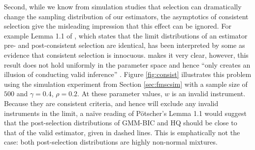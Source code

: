 \documentclass[12pt]{article}
\theoremstyle{definition}
\begin{document}
Second, while we know from simulation studies that selection can dramatically change the sampling distribution of our estimators, the asymptotics of consistent selection give the misleading impression that this effect can be ignored.
For example Lemma 1.1 of \citet[p.\ 168]{Poetscher1991}, which states that the limit distributions of an estimator pre- and post-consistent selection are identical, has been interpreted by some as evidence that consistent selection is innocuous. 
\citet[pp.\ 179--180]{Poetscher1991} makes it very clear, however, this result does not hold uniformly in the parameter space and hence ``only creates an illusion of conducting valid inference'' \citep[p.\ 22]{LeebPoetscher2005}.
Figure \ref{fig:consist} illustrates this problem using the simulation experiment from Section \ref{sec:fmscsim} with a sample size of $500$ and $\gamma = 0.4$, $\rho= 0.2$.
At these parameter values, $w$ is an invalid instrument.
Because they are consistent criteria, and hence will exclude any invalid instruments in the limit, a na\"{i}ve reading of P\"{o}tscher's Lemma 1.1 would suggest that the post-selection distributions of GMM-BIC and HQ should be close to that of the valid estimator, given in dashed lines.
This is emphatically not the case: both post-selection distributions are highly non-normal mixtures. 
\end{document}
